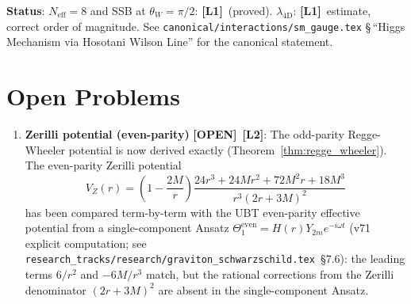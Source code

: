 \documentclass[11pt,a4paper]{article}
\theoremstyle{definition}
\theoremstyle{remark}
\newcommand{\Lone}{\textbf{[L1]}}
\newcommand{\Ltwo}{\textbf{[L2]}}
\newcommand{\OPEN}{\textbf{[OPEN]}}
\begin{document}
\medskip
\noindent\textbf{Status}: $N_{\mathrm{eff}} = 8$ and SSB at $\theta_W = \pi/2$: \Lone\ (proved).
$\lambda_{\mathrm{4D}}$: \Lone\ estimate, correct order of magnitude.
See \texttt{canonical/interactions/sm\_gauge.tex}
§\,``Higgs Mechanism via Hosotani Wilson Line'' for the canonical statement.

\section{Open Problems}
\label{sec:open}

\begin{enumerate}
  \item \textbf{Zerilli potential (even-parity)} \OPEN\ \Ltwo:
        The odd-parity Regge-Wheeler potential is now derived exactly
        (Theorem~\ref{thm:regge_wheeler}).  The even-parity Zerilli
        potential
        \begin{equation}
          V_Z(r) = \left(1-\frac{2M}{r}\right)
            \frac{24r^3+24Mr^2+72M^2r+18M^3}{r^3(2r+3M)^2}
        \end{equation}
        has been compared term-by-term with the UBT even-parity effective
        potential from a single-component Ansatz
        $\Theta_1^{\text{even}} = H(r)Y_{2m}e^{-i\omega t}$
        (v71 explicit computation; see
        \texttt{research\_tracks/research/graviton\_schwarzschild.tex}~§7.6):
        the leading terms $6/r^2$ and $-6M/r^3$ match, but the rational
        corrections from the Zerilli denominator $(2r+3M)^2$ are absent
        in the single-component Ansatz.


\end{enumerate}
\end{document}
